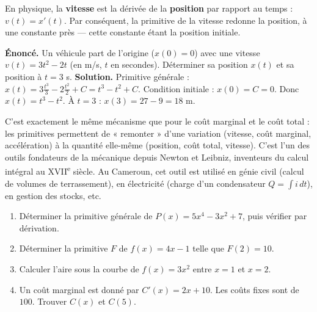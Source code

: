 \documentclass[11pt]{article}
\begin{document}
En physique, la \textbf{vitesse} est la dérivée de la \textbf{position} par rapport au temps : $v(t) = x'(t)$. Par conséquent, la primitive de la vitesse redonne la position, à une constante près — cette constante étant la position initiale.

\begin{exoresolu}
\textbf{Énoncé.} Un véhicule part de l'origine ($x(0)=0$) avec une vitesse $v(t) = 3t^{2} - 2t$ (en m/s, $t$ en secondes). Déterminer sa position $x(t)$ et sa position à $t=3$ s.
\tcblower
\textbf{Solution.}
Primitive générale : $x(t) = 3\frac{t^{3}}{3} - 2\frac{t^{2}}{2} + C = t^{3} - t^{2} + C$.
Condition initiale : $x(0) = C = 0$. Donc $x(t) = t^{3} - t^{2}$.
À $t=3$ : $x(3) = 27 - 9 = 18$ m.
\end{exoresolu}

\begin{savaistu}
C'est exactement le même mécanisme que pour le coût marginal et le coût total : les primitives permettent de « remonter » d'une variation (vitesse, coût marginal, accélération) à la quantité elle-même (position, coût total, vitesse). C'est l'un des outils fondateurs de la mécanique depuis Newton et Leibniz, inventeurs du calcul intégral au XVII\textsuperscript{e} siècle. Au Cameroun, cet outil est utilisé en génie civil (calcul de volumes de terrassement), en électricité (charge d'un condensateur $Q = \int i\,dt$), en gestion des stocks, etc.
\end{savaistu}

\begin{exercice}
\begin{enumerate}
\item Déterminer la primitive générale de $P(x) = 5x^{4} - 3x^{2} + 7$, puis vérifier par dérivation.
\item Déterminer la primitive $F$ de $f(x) = 4x - 1$ telle que $F(2) = 10$.
\item Calculer l'aire sous la courbe de $f(x) = 3x^{2}$ entre $x = 1$ et $x = 2$.
\item Un coût marginal est donné par $C'(x) = 2x + 10$. Les coûts fixes sont de $100$. Trouver $C(x)$ et $C(5)$.
\end{enumerate}
\end{exercice}
\end{document}
